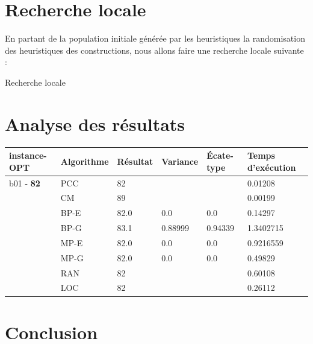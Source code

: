 \documentclass[12pt,a4paper]{article}
\begin{document}
\section{Recherche locale}
En partant de la population initiale générée par les heuristiques la randomisation des heuristiques des constructions, nous allons faire une recherche locale suivante :\\
\begin{algorithm}[H]
	\caption{Recherche locale}
\end{algorithm}

\section{Analyse des résultats}

\begin{center}
	\begin{tabular}{l|l|l|l|l|l}
		instance-OPT & Algorithme & Résultat & Variance & Écate-type & Temps d'exécution\\ \hline \hline
		b01 - \textbf{82}&PCC&82&&&0.01208\\
		&CM&89&&&0.00199\\
		&BP-E&82.0&0.0&0.0&0.14297\\
		&BP-G&83.1&0.88999&0.94339&1.3402715\\
		&MP-E&82.0&0.0&0.0&0.9216559\\
		&MP-G&82.0&0.0&0.0&0.49829\\
		&RAN&82&&&0.60108\\
		&LOC&82&&&0.26112\\
		 \hline
	\end{tabular}
\end{center}

\section{Conclusion}
\end{document}
